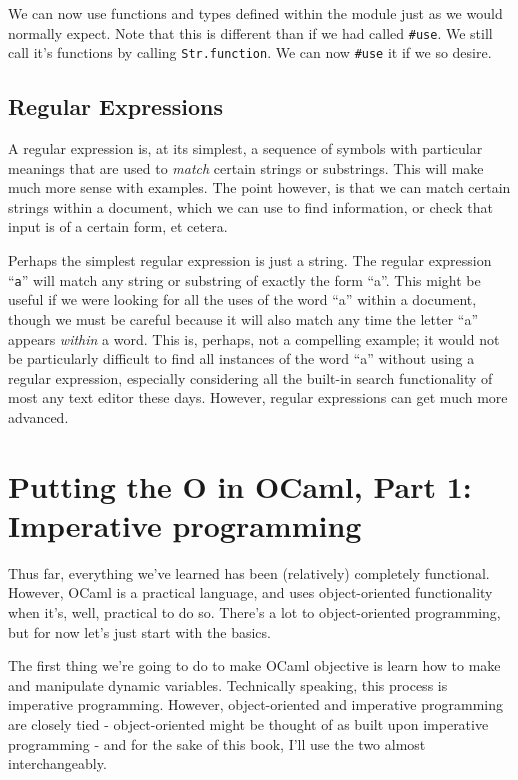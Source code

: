 \documentclass[10pt]{book}
\begin{document}
{We can now use functions and types defined within the module just as we would normally expect. Note that this is different than if we had called {\tt #use}. We still call it's functions by calling {\tt Str.function}. We can now {\tt #use} it if we so desire.

\section{Regular Expressions}

A regular expression is, at its simplest, a sequence of symbols with particular meanings that are used to {\em match} certain strings or substrings. This will make much more sense with examples. The point however, is that we can match certain strings within a document, which we can use to find information, or check that input is of a certain form, et cetera.

Perhaps the simplest regular expression is just a string. The regular expression ``{\tt a}'' will match any string or substring of exactly the form ``a''. This might be useful if we were looking for all the uses of the word ``a'' within a document, though we must be careful because it will also match any time the letter ``a'' appears {\it within} a word. This is, perhaps, not a compelling example; it would not be particularly difficult to find all instances of the word ``a'' without using a regular expression, especially considering all the built-in search functionality of most any text editor these days. However, regular expressions can get much more advanced.




\chapter{Putting the O in OCaml, Part 1: Imperative programming}

Thus far, everything we've learned has been (relatively) completely functional.
However, OCaml is a practical language, and uses object-oriented functionality 
when it's, well, practical to do so. There's a lot to object-oriented programming,
but for now let's just start with the basics.

The first thing we're going to do to make OCaml objective is learn how to make 
and manipulate dynamic variables. Technically speaking, this process is imperative 
programming. However, object-oriented and imperative programming are closely tied - 
object-oriented might be thought of as built upon imperative programming - and for 
the sake of this book, I'll use the two almost interchangeably.

}
\end{document}

